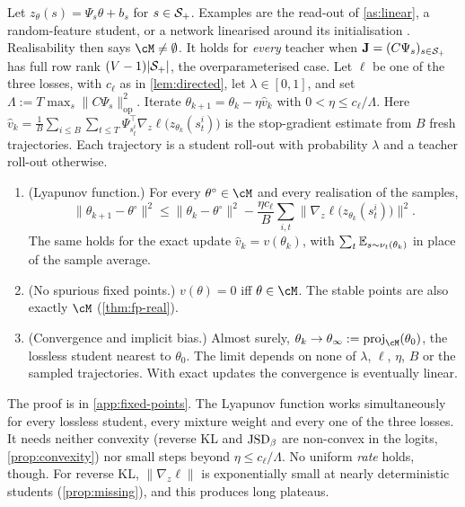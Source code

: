\begin{theorem}\label{thm:fejer}
\Ck Let $z_\theta(s)=\Psi_s\theta+b_s$ for $s\in\mathcal{S}_+$. Examples are the read-out of \cref{as:linear}, a random-feature student, or a
network linearised around its initialisation \citep{jacot2018neural,chizat2019lazy}. Realisability then says $\cM\ne\emptyset$. It holds
for \emph{every} teacher when $\mathbf J=(C\Psi_s)_{s\in\mathcal{S}_+}$ has full row rank $(V-1)|\mathcal{S}_+|$, the overparameterised case. Let $\ell$ be
one of the three losses, with $c_\ell$ as in \cref{lem:directed}, let $\lambda\in[0,1]$, and set $\Lambda:=T\max_s\|C\Psi_s\|_{\mathrm{op}}^2$. Iterate
$\theta_{k+1}=\theta_k-\eta\hat v_k$ with $0<\eta\le c_\ell/\Lambda$. Here
$\hat v_k=\frac1B\sum_{i\le B}\sum_{t\le T}\Psi_{s^i_t}^\top\nabla_z\ell\big(z_{\theta_k}(s^i_t)\big)$ is the stop-gradient estimate from $B$ fresh trajectories. Each
trajectory is a student roll-out with probability $\lambda$ and a teacher roll-out otherwise.
\begin{enumerate}[label=(\roman*),nosep]
\item (Lyapunov function.) For every $\theta^\circ\in\cM$ and every realisation of the samples,
\[
\|\theta_{k+1}-\theta^\circ\|^2\le\|\theta_k-\theta^\circ\|^2-\frac{\eta c_\ell}{B}\sum_{i,t}\big\|\nabla_z\ell\big(z_{\theta_k}(s^i_t)\big)\big\|^2 .
\]
The same holds for the exact update $\hat v_k=v(\theta_k)$, with $\sum_t\mathbb{E}_{s\sim\nu_t(\theta_k)}$ in place of the sample average.
\item (No spurious fixed points.) $v(\theta)=0$ iff $\theta\in\cM$. The stable points are also exactly $\cM$ (\cref{thm:fp-real}).
\item (Convergence and implicit bias.) Almost surely, $\theta_k\to\theta_\infty:=\operatorname{proj}_\cM(\theta_0)$, the lossless student nearest to $\theta_0$.
The limit depends on none of $\lambda$, $\ell$, $\eta$, $B$ or the sampled trajectories. With exact updates the convergence is eventually
linear.
\end{enumerate}
\end{theorem}
\noindent
The proof is in \cref{app:fixed-points}. The Lyapunov function works simultaneously for every lossless student, every
mixture weight and every one of the three losses. It needs neither convexity (reverse KL and $\mathrm{JSD}_\beta$ are non-convex
in the logits, \cref{prop:convexity}) nor small steps beyond $\eta\le c_\ell/\Lambda$. No uniform \emph{rate} holds, though. For reverse KL,
$\|\nabla_z\ell\|$ is exponentially small at nearly deterministic students (\cref{prop:missing}), and this produces long
plateaus.

